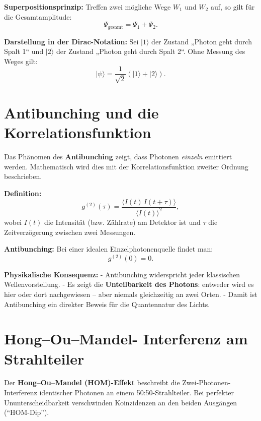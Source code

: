 \textbf{Superpositionsprinzip:}  
Treffen zwei mögliche Wege \( W_1 \) und \( W_2 \) auf, so gilt für die Gesamtamplitude:
\[
\Psi_{\text{gesamt}} = \Psi_{1} + \Psi_{2}.
\]

\textbf{Darstellung in der Dirac-Notation:}  
Sei \(|1\rangle\) der Zustand „Photon geht durch Spalt 1“ und \(|2\rangle\) der Zustand „Photon geht durch Spalt 2“.  
Ohne Messung des Weges gilt:
\[
|\psi\rangle = \frac{1}{\sqrt{2}} \left( |1\rangle + |2\rangle \right).
\]

\section{Antibunching und die Korrelationsfunktion}
\label{anhangA:antibunching}

Das Phänomen des \textbf{Antibunching} zeigt, dass Photonen \emph{einzeln} emittiert werden. 
Mathematisch wird dies mit der Korrelationsfunktion zweiter Ordnung beschrieben.

\textbf{Definition:}
\[
g^{(2)}(\tau) = \frac{\langle I(t) \, I(t+\tau) \rangle}{\langle I(t) \rangle^2},
\]
wobei \( I(t) \) die Intensität (bzw. Zählrate) am Detektor ist und \(\tau\) die Zeitverzögerung zwischen zwei Messungen.

\textbf{Antibunching:}
Bei einer idealen Einzelphotonenquelle findet man:
\[
g^{(2)}(0) = 0.
\]

\textbf{Physikalische Konsequenz:}
- Antibunching widerspricht jeder klassischen Wellenvorstellung.  
- Es zeigt die \textbf{Unteilbarkeit des Photons}: entweder wird es hier oder dort nachgewiesen – aber niemals gleichzeitig an zwei Orten.  
- Damit ist Antibunching ein direkter Beweis für die Quantennatur des Lichts.

\section{Hong--Ou--Mandel- Interferenz am Strahlteiler}
\label{anhangA:HOM}

Der \textbf{Hong--Ou--Mandel (HOM)-Effekt} beschreibt die Zwei-Pho\-tonen-Interferenz identischer Photonen an einem 50:50-Strahlteiler.
Bei perfekter Ununterscheidbarkeit verschwinden Koinzidenzen an den beiden Ausgängen (``HOM-Dip'').

